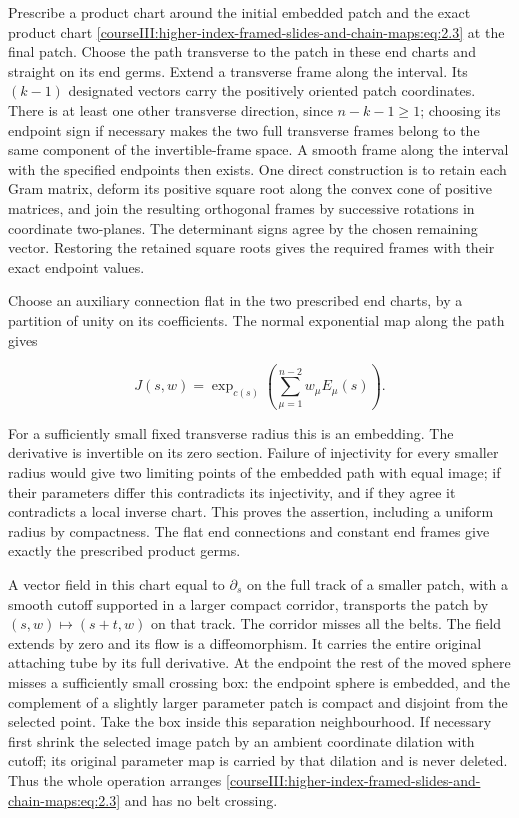 Prescribe a product chart around the initial embedded patch and the exact product chart \eqref{courseIII:higher-index-framed-slides-and-chain-maps:eq:2.3} at the final patch. Choose the path transverse to the patch in these end charts and straight on its end germs. Extend a transverse frame along the interval. Its \((k-1)\) designated vectors carry the positively oriented patch coordinates. There is at least one other transverse direction, since \(n-k-1\geq1\); choosing its endpoint sign if necessary makes the two full transverse frames belong to the same component of the invertible-frame space. A smooth frame along the interval with the specified endpoints then exists. One direct construction is to retain each Gram matrix, deform its positive square root along the convex cone of positive matrices, and join the resulting orthogonal frames by successive rotations in coordinate two-planes. The determinant signs agree by the chosen remaining vector. Restoring the retained square roots gives the required frames with their exact endpoint values.

Choose an auxiliary connection flat in the two prescribed end charts, by a partition of unity on its coefficients. The normal exponential map along the path gives

\begin{equation}
J(s,w)=\exp_{c(s)}\left(\sum_{\mu=1}^{n-2}w_\mu E_\mu(s)\right).
 \label{courseIII:higher-index-framed-slides-and-chain-maps:eq:2.4}
\end{equation}

For a sufficiently small fixed transverse radius this is an embedding. The derivative is invertible on its zero section. Failure of injectivity for every smaller radius would give two limiting points of the embedded path with equal image; if their parameters differ this contradicts its injectivity, and if they agree it contradicts a local inverse chart. This proves the assertion, including a uniform radius by compactness. The flat end connections and constant end frames give exactly the prescribed product germs.

A vector field in this chart equal to \(\partial_s\) on the full track of a smaller patch, with a smooth cutoff supported in a larger compact corridor, transports the patch by \((s,w)\mapsto(s+t,w)\) on that track. The corridor misses all the belts. The field extends by zero and its flow is a diffeomorphism. It carries the entire original attaching tube by its full derivative. At the endpoint the rest of the moved sphere misses a sufficiently small crossing box: the endpoint sphere is embedded, and the complement of a slightly larger parameter patch is compact and disjoint from the selected point. Take the box inside this separation neighbourhood. If necessary first shrink the selected image patch by an ambient coordinate dilation with cutoff; its original parameter map is carried by that dilation and is never deleted. Thus the whole operation arranges \eqref{courseIII:higher-index-framed-slides-and-chain-maps:eq:2.3} and has no belt crossing.

